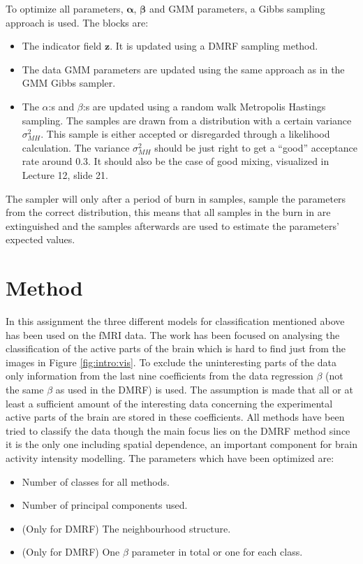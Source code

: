 \documentclass[a4paper,english]{article}
\begin{document}
To optimize all parameters, $\boldsymbol{\alpha}$, $\boldsymbol{\beta}$ and GMM parameters, a Gibbs sampling approach is used.
The blocks are:
\begin{itemize}
  \item The indicator field $\boldsymbol{z}$. It is updated using a DMRF sampling method.
  \item The data GMM parameters are updated using the same approach as in the GMM Gibbs sampler.
  \item The $\alpha$:s and $\beta$:s are updated using a random walk Metropolis Hastings sampling.
    The samples are drawn from a distribution with a certain variance $\sigma_{MH}^2$.
    This sample is either accepted or disregarded through a likelihood calculation.
    The variance $\sigma_{MH}^2$ should be just right to get a ``good'' acceptance rate around $0.3$.
    It should also be the case of good mixing, visualized in Lecture 12, slide 21\cite{L12}.
\end{itemize}
The sampler will only after a period of burn in samples, sample the parameters from the correct distribution, this means that all samples in the burn in are extinguished and the samples afterwards are used to estimate the parameters' expected values.


\section{Method}
In this assignment the three different models for classification mentioned above has been used on the fMRI data.
The work has been focused on analysing the classification of the active parts of the brain which is hard to find just from the images in Figure \ref{fig:intro:vis}.
To exclude the uninteresting parts of the data only information from the last nine coefficients from the data regression $\beta$ (not the same $\beta$ as used in the DMRF) is used.
The assumption is made that all or at least a sufficient amount of the interesting data concerning the experimental active parts of the brain are stored in these coefficients.
All methods have been tried to classify the data though the main focus lies on the DMRF method since it is the only one including spatial dependence, an important component for brain activity intensity modelling.
The parameters which have been optimized are:
\begin{itemize}
  \item Number of classes for all methods.
  \item Number of principal components used.
  \item (Only for DMRF) The neighbourhood structure.
  \item (Only for DMRF) One $\beta$ parameter in total or one for each class.
\end{itemize}
\end{document}
